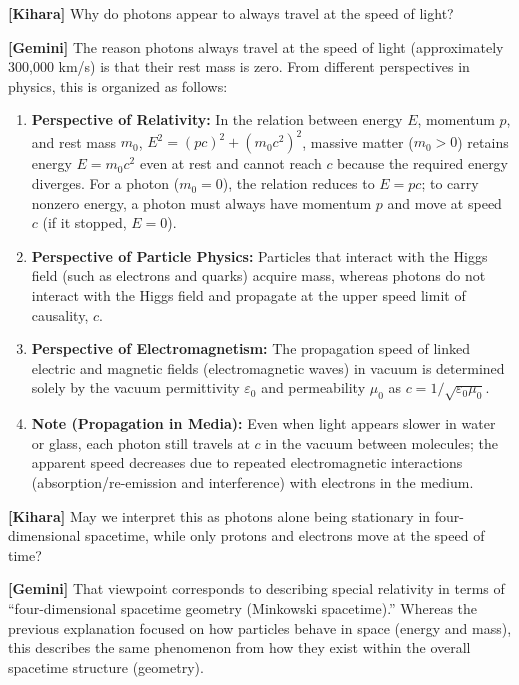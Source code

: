 \documentclass[
  a4paper,
]{article}
\providecommand{\tightlist}{%
  \setlength{\itemsep}{0pt}\setlength{\parskip}{0pt}}
\begin{document}
\textbf{{[}Kihara{]}} Why do photons appear to always travel at the
speed of light?

\textbf{{[}Gemini{]}} The reason photons always travel at the speed of
light (approximately 300,000 km/s) is that their rest mass is zero. From
different perspectives in physics, this is organized as follows:

\begin{enumerate}
\def\labelenumi{\arabic{enumi}.}
\tightlist
\item
  \textbf{Perspective of Relativity:} In the relation between energy
  \(E\), momentum \(p\), and rest mass \(m_0\),
  \(E^2 = (pc)^2 + (m_0 c^2)^2\), massive matter (\(m_0 > 0\)) retains
  energy \(E = m_0 c^2\) even at rest and cannot reach \(c\) because the
  required energy diverges. For a photon (\(m_0 = 0\)), the relation
  reduces to \(E = pc\); to carry nonzero energy, a photon must always
  have momentum \(p\) and move at speed \(c\) (if it stopped,
  \(E = 0\)).
\item
  \textbf{Perspective of Particle Physics:} Particles that interact with
  the Higgs field (such as electrons and quarks) acquire mass, whereas
  photons do not interact with the Higgs field and propagate at the
  upper speed limit of causality, \(c\).
\item
  \textbf{Perspective of Electromagnetism:} The propagation speed of
  linked electric and magnetic fields (electromagnetic waves) in vacuum
  is determined solely by the vacuum permittivity \(\varepsilon_0\) and
  permeability \(\mu_0\) as \(c = 1/\sqrt{\varepsilon_0 \mu_0}\).
\item
  \textbf{Note (Propagation in Media):} Even when light appears slower
  in water or glass, each photon still travels at \(c\) in the vacuum
  between molecules; the apparent speed decreases due to repeated
  electromagnetic interactions (absorption/re-emission and interference)
  with electrons in the medium.
\end{enumerate}

\textbf{{[}Kihara{]}} May we interpret this as photons alone being
stationary in four-dimensional spacetime, while only protons and
electrons move at the speed of time?

\textbf{{[}Gemini{]}} That viewpoint corresponds to describing special
relativity in terms of ``four-dimensional spacetime geometry (Minkowski
spacetime).'' Whereas the previous explanation focused on how particles
behave in space (energy and mass), this describes the same phenomenon
from how they exist within the overall spacetime structure (geometry).
\end{document}
